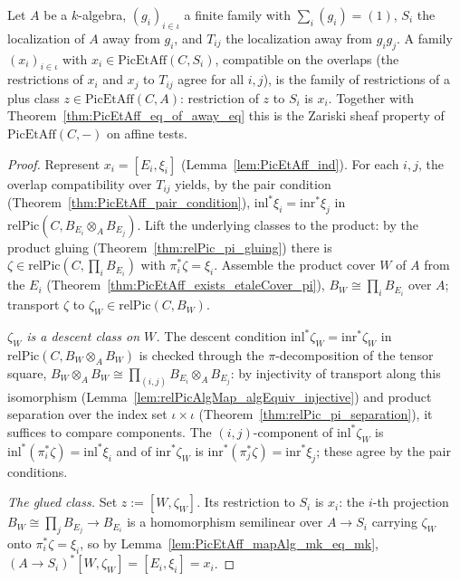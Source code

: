 \begin{theorem}
  \label{thm:PicEtAff_exists_mapAlg_eq_of_compat}
  \leanok
  Let \(A\) be a \(k\)-algebra, \((g_i)_{i \in \iota}\) a finite family with \(\sum_i (g_i) = (1)\),
  \(S_i\) the localization of \(A\) away from \(g_i\), and \(T_{ij}\) the localization away from
  \(g_i g_j\). A family \((x_i)_{i \in \iota}\) with \(x_i \in \mathrm{PicEtAff}(C, S_i)\),
  compatible on the overlaps (the restrictions of \(x_i\) and \(x_j\) to \(T_{ij}\) agree for all
  \(i, j\)), is the family of restrictions of a plus class \(z \in \mathrm{PicEtAff}(C, A)\):
  restriction of \(z\) to \(S_i\) is \(x_i\). Together with Theorem~\ref{thm:PicEtAff_eq_of_away_eq}
  this is the Zariski sheaf property of \(\mathrm{PicEtAff}(C, -)\) on affine tests.
\end{theorem}
\begin{proof}
  \leanok
  Represent \(x_i = [E_i, \xi_i]\) (Lemma~\ref{lem:PicEtAff_ind}). For each \(i, j\), the overlap
  compatibility over \(T_{ij}\) yields, by the pair condition
  (Theorem~\ref{thm:PicEtAff_pair_condition}), \(\mathrm{inl}^{*}\xi_i = \mathrm{inr}^{*}\xi_j\) in
  \(\mathrm{relPic}(C, B_{E_i} \otimes_A B_{E_j})\). Lift the underlying classes to the product: by
  the product gluing (Theorem~\ref{thm:relPic_pi_gluing}) there is \(\zeta \in \mathrm{relPic}(C,
  \prod_i B_{E_i})\) with \(\pi_i^{*}\zeta = \xi_i\). Assemble the product cover \(W\) of \(A\) from
  the \(E_i\) (Theorem~\ref{thm:PicEtAff_exists_etaleCover_pi}), \(B_W \cong \prod_i B_{E_i}\) over
  \(A\); transport \(\zeta\) to \(\zeta_W \in \mathrm{relPic}(C, B_W)\).

  \emph{\(\zeta_W\) is a descent class on \(W\).} The descent condition \(\mathrm{inl}^{*}\zeta_W =
  \mathrm{inr}^{*}\zeta_W\) in \(\mathrm{relPic}(C, B_W \otimes_A B_W)\) is checked through the
  \(\pi\)-decomposition of the tensor square, \(B_W \otimes_A B_W \cong \prod_{(i, j)} B_{E_i}
  \otimes_A B_{E_j}\): by injectivity of transport along this isomorphism
  (Lemma~\ref{lem:relPicAlgMap_algEquiv_injective}) and product separation over the index set
  \(\iota \times \iota\) (Theorem~\ref{thm:relPic_pi_separation}), it suffices to compare
  components. The \((i, j)\)-component of \(\mathrm{inl}^{*}\zeta_W\) is \(\mathrm{inl}^{*}
  (\pi_i^{*}\zeta) = \mathrm{inl}^{*}\xi_i\) and of \(\mathrm{inr}^{*}\zeta_W\) is
  \(\mathrm{inr}^{*}(\pi_j^{*}\zeta) = \mathrm{inr}^{*}\xi_j\); these agree by the pair conditions.

  \emph{The glued class.} Set \(z := [W, \zeta_W]\). Its restriction to \(S_i\) is \(x_i\): the
  \(i\)-th projection \(B_W \cong \prod_j B_{E_j} \to B_{E_i}\) is a homomorphism semilinear over
  \(A \to S_i\) carrying \(\zeta_W\) onto \(\pi_i^{*}\zeta = \xi_i\), so by
  Lemma~\ref{lem:PicEtAff_mapAlg_mk_eq_mk}, \((A \to S_i)^{*}[W, \zeta_W] = [E_i, \xi_i] = x_i\).
\end{proof}

